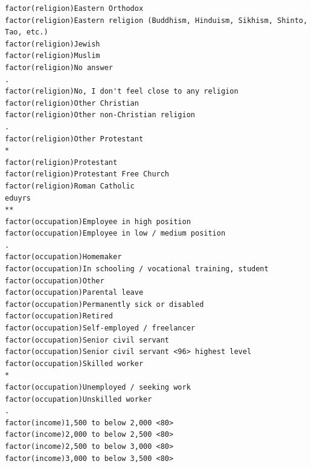 \documentclass[
]{article}
\begin{document}
\begin{table}
\begin{minipage}[t]{\linewidth}
{\begin{verbatim}
factor(religion)Eastern Orthodox                                                     
factor(religion)Eastern religion (Buddhism, Hinduism, Sikhism, Shinto, Tao, etc.)    
factor(religion)Jewish                                                               
factor(religion)Muslim                                                               
factor(religion)No answer                                                         .  
factor(religion)No, I don't feel close to any religion                               
factor(religion)Other Christian                                                      
factor(religion)Other non-Christian religion                                      .  
factor(religion)Other Protestant                                                  *  
factor(religion)Protestant                                                           
factor(religion)Protestant Free Church                                               
factor(religion)Roman Catholic                                                       
eduyrs                                                                            ** 
factor(occupation)Employee in high position                                          
factor(occupation)Employee in low / medium position                               .  
factor(occupation)Homemaker                                                          
factor(occupation)In schooling / vocational training, student                        
factor(occupation)Other                                                              
factor(occupation)Parental leave                                                     
factor(occupation)Permanently sick or disabled                                       
factor(occupation)Retired                                                            
factor(occupation)Self-employed / freelancer                                         
factor(occupation)Senior civil servant                                               
factor(occupation)Senior civil servant <96> highest level                            
factor(occupation)Skilled worker                                                  *  
factor(occupation)Unemployed / seeking work                                          
factor(occupation)Unskilled worker                                                .  
factor(income)1,500 to below 2,000 <80>                                              
factor(income)2,000 to below 2,500 <80>                                              
factor(income)2,500 to below 3,000 <80>                                              
factor(income)3,000 to below 3,500 <80>                                              

\end{verbatim}}
\end{minipage}
\end{table}
\end{document}
